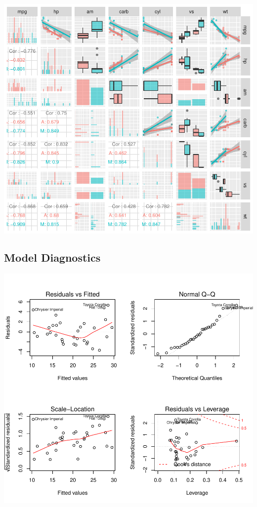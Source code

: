 \documentclass[]{article}
\let\origfigure\figure
\let\endorigfigure\endfigure
\renewenvironment{figure}[1][2] {
    \expandafter\origfigure\expandafter[H]
} {
    \endorigfigure
}
\begin{document}
\begin{figure}[htbp]
\centering
\includegraphics{Regression_Models_Course_Project_files/figure-latex/model_pairs_plot-1.pdf}
\caption{Pairs Plot of Variables of Best Constrained and Unconstrained
Models}
\end{figure}

\subsection{Model Diagnostics}\label{model-diagnostics-1}

\begin{figure}[htbp]
\centering
\includegraphics{Regression_Models_Course_Project_files/figure-latex/diagnostics-1.pdf}
\caption{Diagnostic Plots - Best Model that Includes Transmission Type}
\end{figure}
\end{document}
